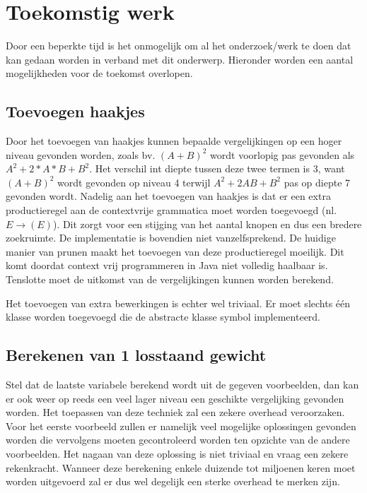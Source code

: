 \documentclass[Main.tex]{subfiles}
\begin{document}
\section{Toekomstig werk}
Door een beperkte tijd is het onmogelijk om al het onderzoek/werk te doen dat kan gedaan worden in verband met dit onderwerp. Hieronder worden een aantal mogelijkheden voor de toekomst overlopen.

\subsection{Toevoegen haakjes}
Door het toevoegen van haakjes kunnen bepaalde vergelijkingen op een hoger niveau gevonden worden, zoals bv. $(A+B)^2$ wordt voorlopig pas gevonden als $A^{2}+2 \ast A \ast B+B^{2}$. Het verschil int diepte tussen deze twee termen is 3, want $(A+B)^2$ wordt gevonden op niveau 4 terwijl $A^{2}+2AB+B^{2}$ pas op diepte 7 gevonden wordt. Nadelig aan het toevoegen van haakjes is dat er een extra productieregel aan de contextvrije grammatica moet worden toegevoegd (nl. $E \rightarrow (E)$). Dit zorgt voor een stijging van het aantal knopen en dus een bredere zoekruimte. De implementatie is bovendien niet vanzelfsprekend. De huidige manier van prunen maakt het toevoegen van deze productieregel moeilijk. Dit komt doordat context vrij programmeren in Java niet volledig haalbaar is. Tenslotte moet de uitkomst van de vergelijkingen kunnen worden berekend.\par 
Het toevoegen van extra bewerkingen is echter wel triviaal. Er moet slechts \'e\'en klasse worden toegevoegd die de abstracte klasse symbol implementeerd.

\subsection{Berekenen van 1 losstaand gewicht}
Stel dat de laatste variabele berekend wordt uit de gegeven voorbeelden, dan kan er ook weer op reeds een veel lager niveau een geschikte vergelijking gevonden worden. Het toepassen van deze techniek zal een zekere overhead veroorzaken. Voor het eerste voorbeeld zullen er namelijk veel mogelijke oplossingen gevonden worden die vervolgens moeten gecontroleerd worden ten opzichte van de andere voorbeelden. Het nagaan van deze oplossing is niet triviaal en vraag een zekere rekenkracht. Wanneer deze berekening enkele duizende tot miljoenen keren moet worden uitgevoerd zal er dus wel degelijk een sterke overhead te merken zijn.
\end{document}
